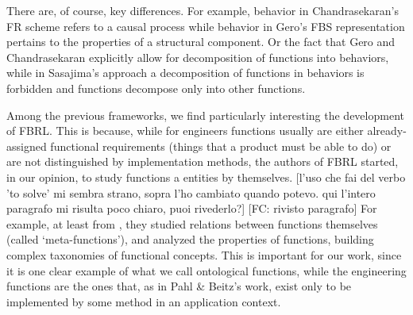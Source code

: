 \documentclass[sw]{iosart2x}
\newcommand{\quotes}[1]{`#1'}
\newcommand{\TODO}[1]{{\color{red} #1}}
\newcommand{\myComment}[1]{}
\begin{document}
There are, of course, key differences. 
For example, behavior in Chandrasekaran’s FR scheme refers to a causal process while behavior in Gero’s FBS representation pertains to the properties of a structural component.
Or the fact that Gero and Chandrasekaran explicitly allow for decomposition of functions into behaviors, while in Sasajima's approach a decomposition of functions in behaviors is forbidden and functions decompose only into other functions.  

Among the previous frameworks, we find particularly interesting the development of FBRL. 
This is because, while for engineers functions usually are either already-assigned functional requirements (things that a product must be able to do) or are not distinguished by implementation methods, the authors of FBRL started, in our opinion, to study functions a entities by themselves.%
\TODO{[l'uso che fai del verbo 'to solve' mi sembra strano, sopra l'ho cambiato quando potevo. qui l'intero paragrafo mi risulta poco chiaro, puoi rivederlo?] [FC: rivisto paragrafo]}
For example, at least from \cite{kitamuraMetaFunctionsArtifacts1999}, they studied relations between functions themselves (called \quotes{meta-functions}), and analyzed the properties of functions, building complex taxonomies of functional concepts.
This is important for our work, since it is one
clear example of what we call ontological functions, while the engineering functions are the ones that, as in Pahl \& Beitz's work, exist only to be implemented \myComment{solved} by some method %
in an application context.
\end{document}
